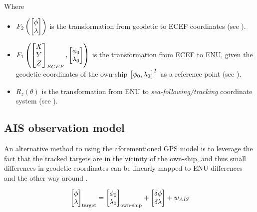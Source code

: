 Where

\begin{itemize}
	\item $F_2\left(\begin{bmatrix}
	{\phi} \\
	{\lambda}
	\end{bmatrix}\right)$ is the transformation from geodetic to ECEF coordinates (see ).
	\item $F_1\left( \begin{bmatrix}
	X \\
	Y \\
	Z
	\end{bmatrix}_{ECEF},\begin{bmatrix}
	{\phi}_0 \\
	{\lambda}_0
	\end{bmatrix}\right)$ is the transformation from ECEF to ENU, given the geodetic coordinates of the own-ship $\begin{bmatrix}
	{\phi}_0,
	{\lambda}_0
	\end{bmatrix}^T$ as a reference point (see ).
	\item $R_z(\theta)$ is the transformation from ENU to \emph{sea-following/tracking }coordinate system (see ).
\end{itemize}

\subsection{AIS observation model}

An alternative method to using the aforementioned GPS model is to leverage the fact that the tracked targets are in the vicinity of the own-ship, and thus small differences in geodetic coordinates can be linearly mapped to ENU differences and the other way around \cite{Wellenhof1997}.



\begin{equation}
	\begin{bmatrix}
		{\phi}\\ {\lambda}
		\end{bmatrix}_{\text{target}}=
		\begin{bmatrix}
		{\phi}_{0}\\ {\lambda}_{0}
	\end{bmatrix}_{\text{own-ship}} + \begin{bmatrix}
	\delta{\phi} \\ \delta{\lambda}
	\end{bmatrix} + {w}_{\textit{AIS}}
\end{equation}


